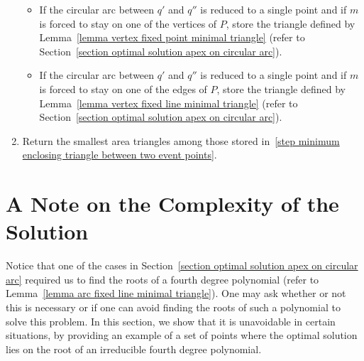 \documentclass[11pt, oneside]{article}
\begin{document}
\begin{algorithm}
\begin{enumerate}
\begin{itemize}
\item If the circular arc between $q'$ and $q''$ 
is reduced to a single point
and if $m$ is forced to stay 
on one of the vertices of $P$,
store the triangle defined by Lemma~\ref{lemma vertex fixed point minimal triangle}
(refer to Section~\ref{section optimal solution apex on circular arc}).

\item If the circular arc between $q'$ and $q''$ 
is reduced to a single point
and if $m$ is forced to stay 
on one of the edges of $P$,
store the triangle defined by Lemma~\ref{lemma vertex fixed line minimal triangle}
(refer to Section~\ref{section optimal solution apex on circular arc}).
\end{itemize}

\item Return the smallest area triangles among those stored
in~\ref{step minimum enclosing triangle between two event points}.
\end{enumerate}
\end{algorithm}




\section{A Note on the Complexity of the Solution}
\label{section complexity solution}



Notice that one of the cases 
in Section~\ref{section optimal solution apex on circular arc} 
required us to find the roots of a fourth degree polynomial
(refer to Lemma~\ref{lemma arc fixed line minimal triangle}). 
One may ask whether or not 
this is necessary or if one can avoid 
finding the roots of such a polynomial
to solve this problem.
In this section, 
we show that it is unavoidable in certain situations, 
by providing an example of a set of points 
where the optimal solution lies on the root 
of an irreducible fourth degree polynomial.
\end{document}
